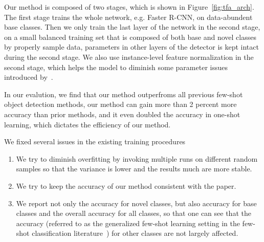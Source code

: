 Our method is composed of two stages, which is shown in Figure~\ref{fig:tfa_arch}. The first stage trains the whole network, e.g. Faster R-CNN, on data-abundent base classes. Then we only train the last layer of the network in the second stage, on a small balanced training set that is composed of both base and novel classes by properly sample data, parameters in other layers of the detector is kept intact during the second stage. We also use instance-level feature normalization in the second stage, which helps the model to diminish some parameter issues introduced by~\citet{gidaris2018dynamic}.

In our evalution, we find that our method outperfroms all previous few-shot object detection methods, our method can gain more than 2 percent more accuracy than prior methods, and it even doubled the accuracy in one-shot learning, which dictates the efficiency of our method.

We fixed several issues in the existing training procedures
\begin{enumerate}
    \item We try to diminish overfitting by invoking multiple runs on different random samples so that the variance is lower and the results much are more stable.
    \item We try to keep the accuracy of our method consistent with the paper.
    \item We report not only the accuracy for novel classes, but also accuracy for base classes and the overall accuracy for all classes, so that one can see that the accuracy (referred to as the generalized few-shot learning setting in the few-shot classification literature~\cite{hariharan2017low,wang2019tafe}) for other classes are not largely affected.
\end{enumerate}
